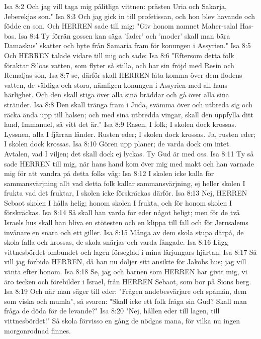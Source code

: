 Isa 8:2  Och jag vill taga mig pålitliga vittnen: prästen Uria och Sakarja, Jeberekjas son."
Isa 8:3  Och jag gick in till profetissan, och hon blev havande och födde en son. Och HERREN sade till mig: "Giv honom namnet Maher-salal Has-bas.
Isa 8:4  Ty förrän gossen kan säga 'fader' och 'moder' skall man bära Damaskus' skatter och byte från Samaria fram för konungen i Assyrien."
Isa 8:5  Och HERREN talade vidare till mig och sade:
Isa 8:6  "Eftersom detta folk föraktar Siloas vatten, som flyter så stilla, och har sin fröjd med Resin och Remaljas son,
Isa 8:7  se, därför skall HERREN låta komma över dem flodens vatten, de väldiga och stora, nämligen konungen i Assyrien med all hans härlighet. Och den skall stiga över alla sina bräddar och gå över alla sina stränder.
Isa 8:8  Den skall tränga fram i Juda, svämma över och utbreda sig och räcka ända upp till halsen; och med sina utbredda vingar, skall den uppfylla ditt land, Immanuel, så vitt det är."
Isa 8:9  Rasen, I folk; I skolen dock krossas. Lyssnen, alla I fjärran länder. Rusten eder; I skolen dock krossas. Ja, rusten eder; I skolen dock krossas.
Isa 8:10  Gören upp planer; de varda dock om intet. Avtalen, vad I viljen; det skall dock ej lyckas. Ty Gud är med oss.
Isa 8:11  Ty så sade HERREN till mig, när hans hand kom över mig med makt och han varnade mig för att vandra på detta folks väg:
Isa 8:12  I skolen icke kalla för sammansvärjning allt vad detta folk kallar sammansvärjning, ej heller skolen I frukta vad det fruktar, I skolen icke förskräckas därför.
Isa 8:13  Nej, HERREN Sebaot skolen I hålla helig; honom skolen I frukta, och för honom skolen I förskräckas.
Isa 8:14  Så skall han varda för eder något heligt; men för de två Israels hus skall han bliva en stötesten och en klippa till fall och för Jerusalems invånare en snara och ett giller.
Isa 8:15  Många av dem skola stupa därpå, de skola falla och krossas, de skola snärjas och varda fångade.
Isa 8:16  Lägg vittnesbördet ombundet och lagen förseglad i mina lärjungars hjärtan.
Isa 8:17  Så vill jag förbida HERREN, då han nu döljer sitt ansikte för Jakobs hus; jag vill vänta efter honom.
Isa 8:18  Se, jag och barnen som HERREN har givit mig, vi äro tecken och förebilder i Israel, från HERREN Sebaot, som bor på Sions berg.
Isa 8:19  Och när man säger till eder: "Frågen andebesvärjare och spåmän, dem som viska och mumla", så svaren: "Skall icke ett folk fråga sin Gud? Skall man fråga de döda för de levande?"
Isa 8:20  "Nej, hållen eder till lagen, till vittnesbördet!" Så skola förvisso en gång de nödgas mana, för vilka nu ingen morgonrodnad finnes.
